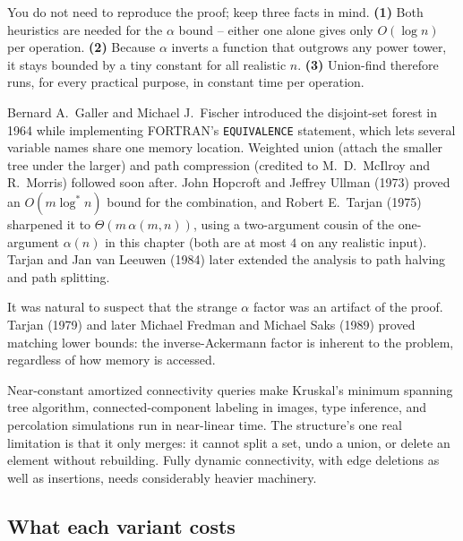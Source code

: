 \begin{focusbox}
You do not need to reproduce the proof; keep three facts in mind. \textbf{(1)}
Both heuristics are needed for the $\alpha$ bound -- either one alone gives
only $O(\log n)$ per operation. \textbf{(2)} Because $\alpha$ inverts a
function that outgrows any power tower, it stays bounded by a tiny constant for
all realistic $n$. \textbf{(3)} Union-find therefore runs, for every practical
purpose, in constant time per operation.
\end{focusbox}

\begin{historybox}
Bernard A.~Galler and Michael J.~Fischer introduced the disjoint-set forest in 1964 while implementing FORTRAN's \lstinline|EQUIVALENCE| statement, which lets several variable names share one memory location. Weighted union (attach the smaller tree under the larger) and path compression (credited to M.~D.~McIlroy and R.~Morris) followed soon after. John Hopcroft and Jeffrey Ullman (1973) proved an $O(m \log^* n)$ bound for the combination, and Robert E.~Tarjan (1975) sharpened it to $\Theta(m\,\alpha(m,n))$, using a two-argument cousin of the one-argument $\alpha(n)$ in this chapter (both are at most $4$ on any realistic input). Tarjan and Jan van Leeuwen (1984) later extended the analysis to path halving and path splitting.

It was natural to suspect that the strange $\alpha$ factor was an artifact of the proof. Tarjan (1979) and later Michael Fredman and Michael Saks (1989) proved matching lower bounds: the inverse-Ackermann factor is inherent to the problem, regardless of how memory is accessed.

Near-constant amortized connectivity queries make Kruskal's minimum spanning tree algorithm, connected-component labeling in images, type inference, and percolation simulations run in near-linear time. The structure's one real limitation is that it only merges: it cannot split a set, undo a union, or delete an element without rebuilding. Fully dynamic connectivity, with edge deletions as well as insertions, needs considerably heavier machinery.
\end{historybox}

\subsection{What each variant costs}
\label{ch19:costs}

